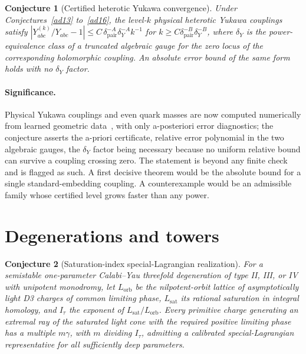 \documentclass[11pt]{article}
\newtheorem{conjecture}{Conjecture}
\theoremstyle{definition}
\begin{document}
\begin{conjecture}[Certified heterotic Yukawa convergence]\label{ad17}
Under Conjectures~\ref{ad13} to~\ref{ad16}, the level-$k$ physical heterotic Yukawa couplings satisfy $|Y^{(k)}_{abc}/Y_{abc}-1|\le C\,\delta_{\mathrm{pair}}^{-A}\delta_Y^{-A}k^{-1}$ for $k\ge C\delta_{\mathrm{pair}}^{-B}\delta_Y^{-B}$, where $\delta_Y$ is the power-equivalence class of a truncated algebraic gauge for the zero locus of the corresponding holomorphic coupling.  An absolute error bound of the same form holds with no $\delta_Y$ factor.
\end{conjecture}

\paragraph{Significance.}
Physical Yukawa couplings and even quark masses are now computed numerically from learned geometric data~\cite{But24,Con24}, with only a-posteriori error diagnostics; the conjecture asserts the a-priori certificate, relative error polynomial in the two algebraic gauges, the $\delta_Y$ factor being necessary because no uniform relative bound can survive a coupling crossing zero.  The statement is beyond any finite check and is flagged as such.  A first decisive theorem would be the absolute bound for a single standard-embedding coupling.  A counterexample would be an admissible family whose certified level grows faster than any power.

\section{Degenerations and towers}

\begin{conjecture}[Saturation-index special-Lagrangian realization]\label{ad18}
For a semistable one-parameter Calabi--Yau threefold degeneration of type II, III, or IV with unipotent monodromy, let $L_{\mathrm{orb}}$ be the nilpotent-orbit lattice of asymptotically light D3 charges of common limiting phase, $L_{\mathrm{sat}}$ its rational saturation in integral homology, and $I_\tau$ the exponent of $L_{\mathrm{sat}}/L_{\mathrm{orb}}$.  Every primitive charge generating an extremal ray of the saturated light cone with the required positive limiting phase has a multiple $m\gamma$, with $m$ dividing $I_\tau$, admitting a calibrated special-Lagrangian representative for all sufficiently deep parameters.
\end{conjecture}
\end{document}
